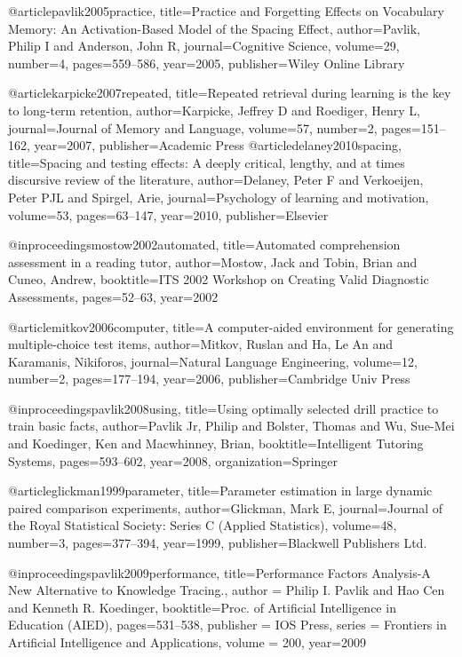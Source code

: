 @article{pavlik2005practice,
  title={Practice and Forgetting Effects on Vocabulary Memory: An Activation-Based Model of the Spacing Effect},
  author={Pavlik, Philip I and Anderson, John R},
  journal={Cognitive Science},
  volume={29},
  number={4},
  pages={559--586},
  year={2005},
  publisher={Wiley Online Library}
}

@article{karpicke2007repeated,
  title={Repeated retrieval during learning is the key to long-term retention},
  author={Karpicke, Jeffrey D and Roediger, Henry L},
  journal={Journal of Memory and Language},
  volume={57},
  number={2},
  pages={151--162},
  year={2007},
  publisher={Academic Press}
}
@article{delaney2010spacing,
  title={Spacing and testing effects: A deeply critical, lengthy, and at times discursive review of the literature},
  author={Delaney, Peter F and Verkoeijen, Peter PJL and Spirgel, Arie},
  journal={Psychology of learning and motivation},
  volume={53},
  pages={63--147},
  year={2010},
  publisher={Elsevier}
}

@inproceedings{mostow2002automated,
  title={Automated comprehension assessment in a reading tutor},
  author={Mostow, Jack and Tobin, Brian and Cuneo, Andrew},
  booktitle={ITS 2002 Workshop on Creating Valid Diagnostic Assessments},
  pages={52--63},
  year={2002}
}

@article{mitkov2006computer,
  title={A computer-aided environment for generating multiple-choice test items},
  author={Mitkov, Ruslan and Ha, Le An and Karamanis, Nikiforos},
  journal={Natural Language Engineering},
  volume={12},
  number={2},
  pages={177--194},
  year={2006},
  publisher={Cambridge Univ Press}
}

@inproceedings{pavlik2008using,
  title={Using optimally selected drill practice to train basic facts},
  author={Pavlik Jr, Philip and Bolster, Thomas and Wu, Sue-Mei and Koedinger, Ken and Macwhinney, Brian},
  booktitle={Intelligent Tutoring Systems},
  pages={593--602},
  year={2008},
  organization={Springer}
}

@article{glickman1999parameter,
  title={Parameter estimation in large dynamic paired comparison experiments},
  author={Glickman, Mark E},
  journal={Journal of the Royal Statistical Society: Series C (Applied Statistics)},
  volume={48},
  number={3},
  pages={377--394},
  year={1999},
  publisher={Blackwell Publishers Ltd.}
}

@inproceedings{pavlik2009performance,
  title={Performance Factors Analysis-A New Alternative to Knowledge Tracing.},
  author    = {Philip I. Pavlik and
               Hao Cen and
               Kenneth R. Koedinger},
  booktitle={Proc. of Artificial Intelligence in Education (AIED)},
  pages={531--538},
    publisher = {IOS Press},
    series    = {Frontiers in Artificial Intelligence and Applications},
  volume    = {200},
  year={2009}
}

